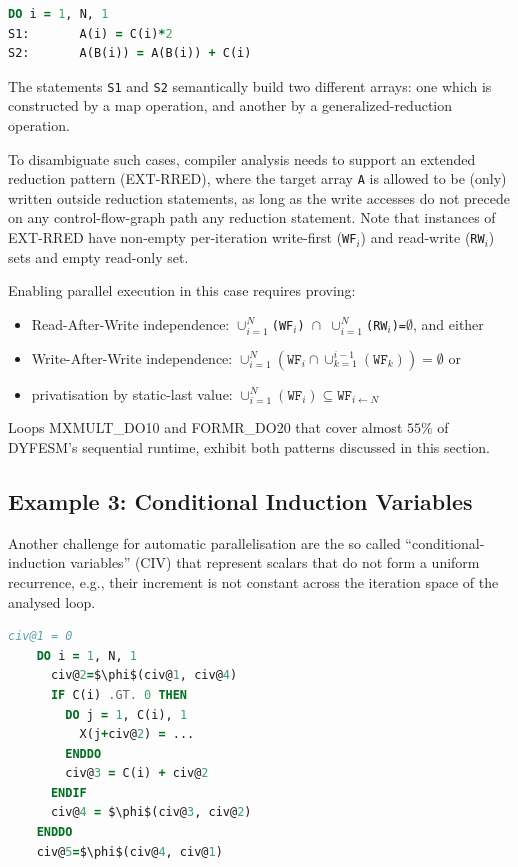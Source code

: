 \begin{lstlisting}[language=fortran]
      DO i = 1, N, 1
S1:       A(i) = C(i)*2
S2:       A(B(i)) = A(B(i)) + C(i)
\end{lstlisting}

The statements \texttt{S1} and \texttt{S2} semantically build two different
arrays: one which is constructed by a map operation, and another
by a generalized-reduction operation.

To disambiguate such cases, compiler analysis needs to support an
extended reduction pattern (EXT-RRED), where the target array
\texttt{A} is allowed to be (only) written outside reduction
statements, as long as the write accesses do not precede on any
control-flow-graph path any reduction statement.  Note that instances
of EXT-RRED have non-empty per-iteration write-first (\texttt{WF$_i$})
and read-write (\texttt{RW$_i$}) sets and empty read-only set.

Enabling parallel execution in this case requires proving:
\begin{itemize}
\item Read-After-Write independence: \texttt{$\cup_{i=1}^N$(WF$_i$)
    $\cap$ $\cup_{i=1}^{N}$(RW$_i$)=$\emptyset$}, and either
\item Write-After-Write independence:
  $\cup_{i=1}^{N}(\texttt{WF}_i \cap \cup_{k=1}^{i-1}(\texttt{WF}_k))=\emptyset$ or
\item privatisation by static-last value:
  $\cup_{i=1}^{N}(\texttt{WF}_i) \subseteq\texttt{WF}_{i\leftarrow N}$
\end{itemize}

Loops MXMULT\_DO10 and FORMR\_DO20 that cover almost $55\%$ of
DYFESM's sequential runtime, exhibit both patterns discussed in this
section.

\subsection{Example 3: Conditional Induction Variables}
\label{subsec:eg3}

Another challenge for automatic parallelisation are the so called
``conditional-induction variables'' (CIV) that represent scalars that
do not form a uniform recurrence, e.g., their increment is not
constant across the iteration space of the analysed loop.

\begin{lstlisting}[language=fortran,mathescape=true,escapechar=|]
    civ@1 = 0
    DO i = 1, N, 1
      civ@2=$\phi$(civ@1, civ@4)
      IF C(i) .GT. 0 THEN
        DO j = 1, C(i), 1
          X(j+civ@2) = ...
        ENDDO
        civ@3 = C(i) + civ@2
      ENDIF
      civ@4 = $\phi$(civ@3, civ@2)
    ENDDO
    civ@5=$\phi$(civ@4, civ@1)
\end{lstlisting}

